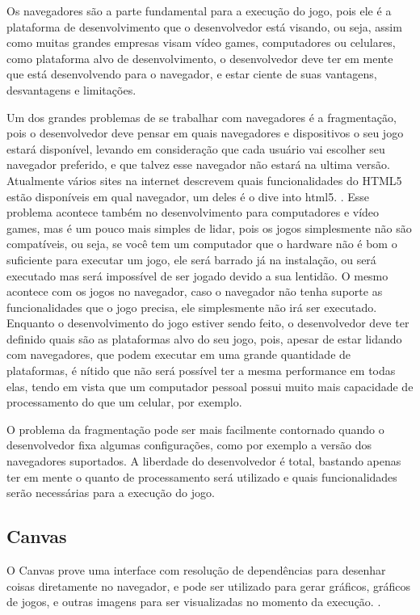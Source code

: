 Os navegadores são a parte fundamental para a execução do jogo, pois
ele é a plataforma de desenvolvimento que o desenvolvedor está visando,
ou seja, assim como muitas grandes empresas visam vídeo games,
computadores ou celulares, como plataforma alvo de desenvolvimento, o
desenvolvedor deve ter em mente que está desenvolvendo para o
navegador, e estar ciente de suas vantagens, desvantagens e
limitações.

Um dos grandes problemas de se trabalhar com navegadores é a
fragmentação, pois o desenvolvedor deve pensar em quais navegadores e
dispositivos o seu jogo estará disponível, levando em consideração
que cada usuário vai escolher seu navegador preferido, e que talvez
esse navegador não estará na ultima versão. Atualmente vários sites na
internet descrevem quais funcionalidades do HTML5 estão disponíveis em
qual navegador, um deles é o dive into html5. \cite{diveintohtml5}.
Esse problema acontece também no desenvolvimento para computadores e
vídeo games, mas é um pouco mais simples de lidar, pois os jogos
simplesmente não são compatíveis, ou seja, se você tem um computador
que o hardware não é bom o suficiente para executar um jogo, ele será
barrado já na instalação, ou será executado mas será impossível de ser
jogado devido a sua lentidão. O mesmo acontece com os jogos no
navegador, caso o navegador não tenha suporte as funcionalidades que o
jogo precisa, ele simplesmente não irá ser executado. Enquanto o
desenvolvimento do jogo estiver sendo feito, o desenvolvedor deve ter
definido quais são as plataformas alvo do seu jogo, pois, apesar de
estar lidando com navegadores, que podem executar em uma grande
quantidade de plataformas, é nítido que não será possível ter a mesma
performance em todas elas, tendo em vista que um computador pessoal
possui muito mais capacidade de processamento do que um celular, por
exemplo.

O problema da fragmentação pode ser mais facilmente contornado quando
o desenvolvedor fixa algumas configurações, como por exemplo a versão
dos navegadores suportados. A liberdade do desenvolvedor é total,
bastando apenas ter em mente o quanto de processamento será utilizado
e quais funcionalidades serão necessárias para a execução do jogo.

\subsection{Canvas}

O Canvas prove uma interface com resolução de dependências para
desenhar coisas diretamente no navegador, e pode ser utilizado para
gerar gráficos, gráficos de jogos, e outras imagens para ser
visualizadas no momento da execução. \cite{w3ccanvas}.

